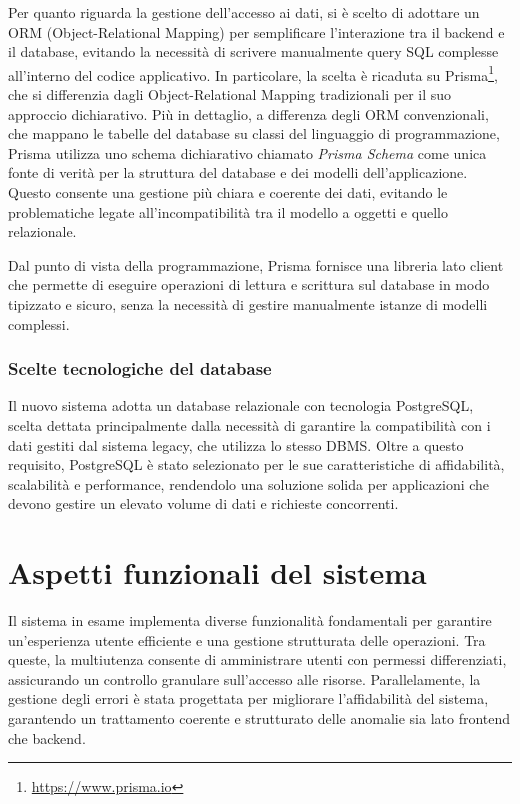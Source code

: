 Per quanto riguarda la gestione dell’accesso ai dati, si è scelto di adottare un ORM (Object-Relational Mapping) per semplificare l’interazione tra il backend e il database, evitando la necessità di scrivere manualmente query SQL complesse all’interno del codice applicativo. In particolare, la scelta è ricaduta su Prisma\footnote{\url{https://www.prisma.io}}, che si differenzia dagli Object-Relational Mapping tradizionali per il suo approccio dichiarativo. Più in dettaglio, a differenza degli ORM convenzionali, che mappano le tabelle del database su classi del linguaggio di programmazione, Prisma utilizza uno schema dichiarativo chiamato \textit{Prisma Schema} come unica fonte di verità per la struttura del database e dei modelli dell’applicazione. Questo consente una gestione più chiara e coerente dei dati, evitando le problematiche legate all'incompatibilità tra il modello a oggetti e quello relazionale.

Dal punto di vista della programmazione, Prisma fornisce una libreria lato client che permette di eseguire operazioni di lettura e scrittura sul database in modo tipizzato e sicuro, senza la necessità di gestire manualmente istanze di modelli complessi.

\subsubsection{Scelte tecnologiche del database}
Il nuovo sistema adotta un database relazionale con tecnologia PostgreSQL, scelta dettata principalmente dalla necessità di garantire la compatibilità con i dati gestiti dal sistema legacy, che utilizza lo stesso DBMS. Oltre a questo requisito, PostgreSQL è stato selezionato per le sue caratteristiche di affidabilità, scalabilità e performance, rendendolo una soluzione solida per applicazioni che devono gestire un elevato volume di dati e richieste concorrenti.

\section{Aspetti funzionali del sistema}
Il sistema in esame implementa diverse funzionalità fondamentali per garantire un'esperienza utente efficiente e una gestione strutturata delle operazioni. Tra queste, la multiutenza consente di amministrare utenti con permessi differenziati, assicurando un controllo granulare sull’accesso alle risorse. Parallelamente, la gestione degli errori è stata progettata per migliorare l'affidabilità del sistema, garantendo un trattamento coerente e strutturato delle anomalie sia lato frontend che backend.

